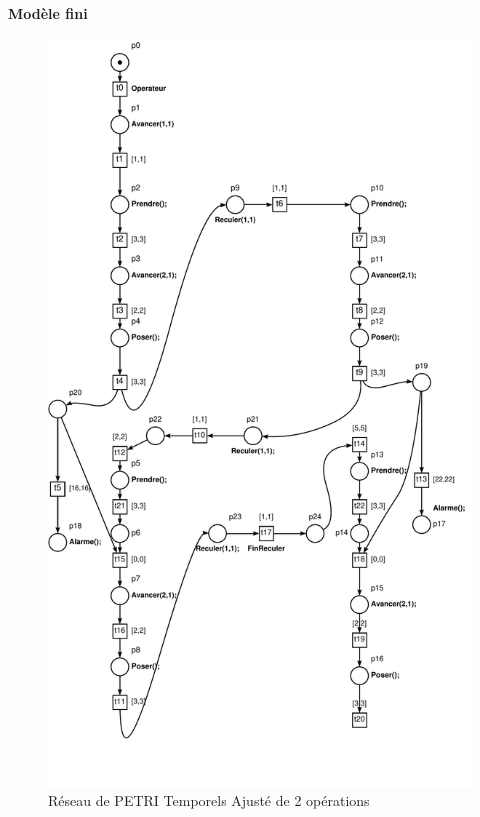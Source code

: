 \paragraph*{Modèle fini}
\begin{figure}
\centering
\includegraphics[height = \textheight]{./II/images/reseau-AjustementIII-2.pdf}
\caption{Réseau de PETRI Temporels Ajusté de 2 opérations}
\end{figure}

